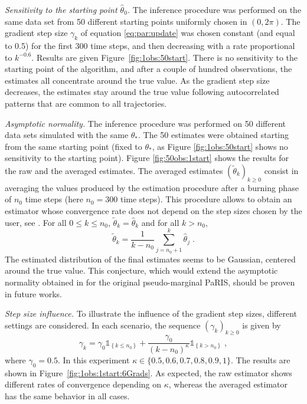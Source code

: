 \documentclass{article}
\newcommand{\parvec}{\theta}
\def\1{\mathds{1}}
\newcommand{\eqsp}{\;}
\begin{document}
{\em Sensitivity to the starting point $\hat{\parvec}_0$.}
The inference procedure was performed on the same data set from 50 different starting points uniformly chosen in $(0,2\pi)$. 
The gradient step size $\gamma_k$ of equation \eqref{eq:par:update} was chosen constant (and equal to 0.5) for the first 300 time steps, and then decreasing with a rate proportional to $k^{-0.6}$. 
Results are given Figure~\ref{fig:1obs:50start}. There is no sensitivity to the starting point of the algorithm, and after a couple of hundred observations, the estimates all concentrate around the true value. 
As the gradient step size decreases, the estimates stay around the true value following autocorrelated patterns that are common to all trajectories.

{\em Asymptotic normality.}
The inference procedure was performed on 50 different data sets simulated with the same $\theta_*$. 
The 50 estimates were obtained starting from the same starting point (fixed to $\theta_*$, as Figure \ref{fig:1obs:50start} shows no sensitivity to the starting point). Figure \ref{fig:50obs:1start} shows the results for the raw and the averaged estimates. 
 The averaged estimates $(\widetilde \parvec_k)_{k\geqslant 0}$ consist in averaging the values produced by the estimation procedure after a burning phase of $n_0$ time steps (here $n_0 =300$ time steps). 
 This procedure allows to obtain an estimator whose convergence rate does not depend on the step sizes chosen by the user, see \cite{polyak1992acceleration,kushner1997stochastic}. For all $0 \leqslant k\leqslant n_0$, $\widetilde \parvec_k = \widehat\parvec_k $ and for all $k>n_0$,
\[
\widetilde \parvec_k = \frac{1}{k-n_0}\sum_{j= n_0+1}^k\widehat\parvec_j\eqsp. 
\]
The estimated distribution of the final estimates seems to be Gaussian, centered around the true value. 
This conjecture, which would extend the asymptotic normality obtained in \cite{gloaguen2021pseudo} for the original pseudo-marginal PaRIS, should be proven in future works.
 
{\em Step size influence.} To illustrate the  influence of the gradient step sizes, different settings are considered. 
In each scenario, the sequence $(\gamma_k)_{k\geqslant 0}$ is given by
\begin{equation*}
\gamma_k = \gamma_0 \1_{\left\lbrace k \leq n_0 \right\rbrace} + \frac{\gamma_0}{(k - n_0)^{\kappa}}\1_{\left\lbrace k > n_0 \right\rbrace}\eqsp,
\end{equation*}
where $\gamma_0 = 0.5$. In this experiment $\kappa\in\{0.5,0.6,0.7,0.8,0.9,1\}$.
The results are shown in Figure~\ref{fig:1obs:1start:6Grads}. 
As expected, the raw estimator shows different rates of convergence depending on $\kappa$, whereas the averaged estimator has the same behavior in all cases. 
\end{document}
